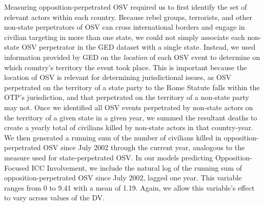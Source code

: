 Measuring opposition-perpetrated OSV required us to first identify the set of relevant actors within each country. Because rebel groups, terrorists, and other non-state perpetrators of OSV can cross international borders and engage in civilian targeting in more than one state, we could not simply associate each non-state OSV perpetrator in the GED dataset with a single state. Instead, we used information provided by GED on the \textit{location} of each OSV event to determine on which country's territory the event took place. This is important because the location of OSV is relevant for determining jurisdictional issues, as OSV perpetrated on the territory of a state party to the Rome Statute falls within the OTP's jurisdiction, and that perpetrated on the territory of a non-state party may not. Once we identified all OSV events perpetrated by non-state actors on the territory of a given state in a given year, we summed the resultant deaths to create a yearly total of civilians killed by non-state actors in that country-year. We then generated a running sum of the number of civilians killed in opposition-perpetrated OSV since July 2002 through the current year, analogous to the measure used for state-perpetrated OSV. In our models predicting Opposition-Focused ICC Involvement, we include the natural log of the running sum of opposition-perpetrated OSV since July 2002, lagged one year. This variable ranges from 0 to 9.41 with a mean of 1.19. Again, we allow this variable's effect to vary across values of the DV.

